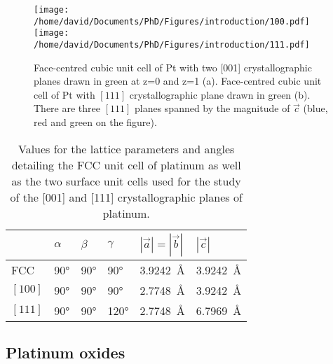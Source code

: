 \begin{figure}[!htb]
    \centering
    \texttt{[image: /home/david/Documents/PhD/Figures/introduction/100.pdf]}
    \texttt{[image: /home/david/Documents/PhD/Figures/introduction/111.pdf]}
    \caption{
        Face-centred cubic unit cell of Pt with two [001] crystallographic planes drawn in green at z=0 and z=1 (a).
        Face-centred cubic unit cell of Pt with $[111]$ crystallographic plane drawn in green (b).
        There are three $[111]$ planes spanned by the magnitude of $\vec{c}$ (blue, red and green on the figure).
    }
    \label{fig:Cubic100Hex111}
\end{figure}

\begin{table}[!htb]
    \centering
    \begin{tabular}{@{}llllll@{}}
    \toprule
     & $\alpha$ & $\beta$ & $\gamma$ & $|\vec{a}| = |\vec{b}|$ & $|\vec{c}|$ \\
    \midrule
    FCC & \ang{90} & \ang{90} & \ang{90} & \qty{3.9242}{\angstrom} & \qty{3.9242}{\angstrom} \\
    $[100]$ & \ang{90} & \ang{90} & \ang{90} & \qty{2.7748}{\angstrom} & \qty{3.9242}{\angstrom} \\
    $[111]$ & \ang{90} & \ang{90} & \ang{120} & \qty{2.7748}{\angstrom} & \qty{6.7969}{\angstrom} \\
    \bottomrule
    \end{tabular}%
    \caption{
        Values for the lattice parameters and angles detailing the FCC unit cell of platinum as well as the two surface unit cells used for the study of the [001] and [111] crystallographic planes of platinum.
        }
    \label{tab:PtStructures}
\end{table}

\subsection{Platinum oxides}

